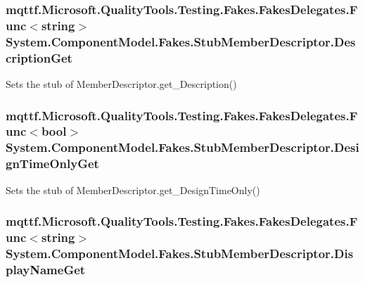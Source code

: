 \hypertarget{class_system_1_1_component_model_1_1_fakes_1_1_stub_member_descriptor_a2c1db94f49bdaade9b34d44922383f40}{
\subsubsection[{Description\-Get}]{\setlength{\rightskip}{0pt plus 5cm}mqttf.\-Microsoft.\-Quality\-Tools.\-Testing.\-Fakes.\-Fakes\-Delegates.\-Func$<$string$>$ System.\-Component\-Model.\-Fakes.\-Stub\-Member\-Descriptor.\-Description\-Get}}\label{class_system_1_1_component_model_1_1_fakes_1_1_stub_member_descriptor_a2c1db94f49bdaade9b34d44922383f40}


Sets the stub of Member\-Descriptor.\-get\-\_\-\-Description()

\hypertarget{class_system_1_1_component_model_1_1_fakes_1_1_stub_member_descriptor_a537461be9d8026ca17b8dab965dff24d}{
\subsubsection[{Design\-Time\-Only\-Get}]{\setlength{\rightskip}{0pt plus 5cm}mqttf.\-Microsoft.\-Quality\-Tools.\-Testing.\-Fakes.\-Fakes\-Delegates.\-Func$<$bool$>$ System.\-Component\-Model.\-Fakes.\-Stub\-Member\-Descriptor.\-Design\-Time\-Only\-Get}}\label{class_system_1_1_component_model_1_1_fakes_1_1_stub_member_descriptor_a537461be9d8026ca17b8dab965dff24d}


Sets the stub of Member\-Descriptor.\-get\-\_\-\-Design\-Time\-Only()

\hypertarget{class_system_1_1_component_model_1_1_fakes_1_1_stub_member_descriptor_ac1b402f6201da67069bbd0fdc109df03}{
\subsubsection[{Display\-Name\-Get}]{\setlength{\rightskip}{0pt plus 5cm}mqttf.\-Microsoft.\-Quality\-Tools.\-Testing.\-Fakes.\-Fakes\-Delegates.\-Func$<$string$>$ System.\-Component\-Model.\-Fakes.\-Stub\-Member\-Descriptor.\-Display\-Name\-Get}}\label{class_system_1_1_component_model_1_1_fakes_1_1_stub_member_descriptor_ac1b402f6201da67069bbd0fdc109df03}


